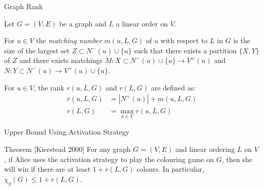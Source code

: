 \documentclass{beamer}
\begin{document}
\begin{frame}{\secname}{Graph Rank}
    
    
    
%    
    
      
    Let $G=(V,E)$ be a graph and $L$ a linear order on $V$.
    
    \begin{definition} 
    For $u \in V$ the \textit{matching number} $m(u, L, G)$ of $u$ with respect to $L$ in $G$ is the size of the largest set $Z \subset N^-(u)\cup\{u\}$ such that there exists a partition $\{X, Y\}$ of $Z$ and there exists matchings $M:X\subset N^-(u)\cup\{u\} \to V^+(u)$ and $N:Y\subset N^-(u)\to V^+(u)\cup\{u\}$.
    \end{definition}
    
    \pause
    
    \begin{definition}[Rank]
    For $u\in V$, the rank $r(u,L,G)$ and $r(L,G)$ are defined as:
    \begin{align*}
    r(u,L,G) & = |N^+(u)| + m(u,L,G) \\
    r(L,G)   & = \max_{u \in V}r(u,L,G)  
    \end{align*}
\end{definition}

\end{frame}


\begin{frame}{\secname}{Upper Bound Using Activation Strategy}
    
    \begin{block}{Theorem [Kierstead 2000]}
        For any graph $G=(V,E)$ and linear ordering $L$ on $V$, if Alice uses the activation strategy to play the colouring game on $G$, then she will win if there are at least $1+r(L, G)$ colours. In particular, $\chi_g(G) \leq 1+r(L, G)$.
    \end{block}
\end{frame}
\end{document}
